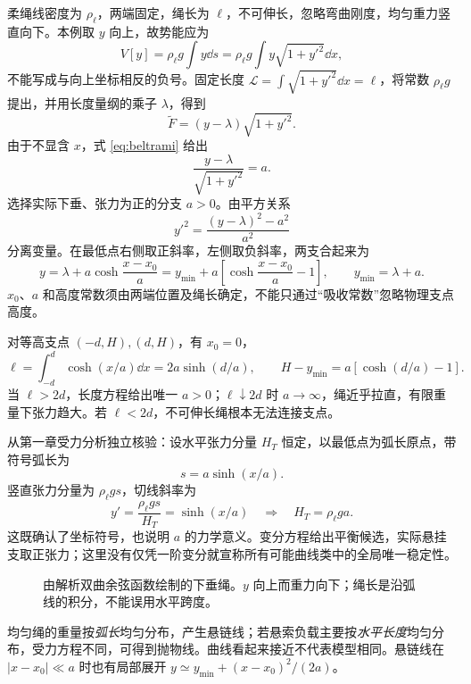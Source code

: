 \begin{example}[均匀柔绳的平衡形状]
柔绳线密度为 $\rho_\ell$，两端固定，绳长为 $\ell$，不可伸长，忽略弯曲刚度，均匀重力竖直向下。本例取 $y$ 向上，故势能应为
\[
V[y]=\rho_\ell g\int y\dd s
=\rho_\ell g\int y\sqrt{1+y'^2}\dd x,
\]
不能写成与向上坐标相反的负号。固定长度 $\mathcal L=\int\sqrt{1+y'^2}\dd x=\ell$，将常数 $\rho_\ell g$ 提出，并用长度量纲的乘子 $\lambda$，得到
\[
\widetilde F=(y-\lambda)\sqrt{1+y'^2}.
\]
由于不显含 $x$，式 \eqref{eq:beltrami} 给出
\[
\frac{y-\lambda}{\sqrt{1+y'^2}}=a.
\]
选择实际下垂、张力为正的分支 $a>0$。由平方关系
\[
y'^2=\frac{(y-\lambda)^2-a^2}{a^2}
\]
分离变量。在最低点右侧取正斜率，左侧取负斜率，两支合起来为
\begin{equation}\label{eq:var-catenary}
y=\lambda+a\cosh\frac{x-x_0}{a}
=y_{\min}+a\left[\cosh\frac{x-x_0}{a}-1\right],
\qquad y_{\min}=\lambda+a.
\end{equation}
$x_0$、$a$ 和高度常数须由两端位置及绳长确定，不能只通过“吸收常数”忽略物理支点高度。

对等高支点 $(-d,H),(d,H)$，有 $x_0=0$，
\[
\ell=\int_{-d}^d\cosh(x/a)\dd x=2a\sinh(d/a),\qquad
H-y_{\min}=a[\cosh(d/a)-1].
\]
当 $\ell>2d$，长度方程给出唯一 $a>0$；$\ell\downarrow2d$ 时 $a\to\infty$，绳近乎拉直，有限重量下张力趋大。若 $\ell<2d$，不可伸长绳根本无法连接支点。

从第一章受力分析独立核验：设水平张力分量 $H_T$ 恒定，以最低点为弧长原点，带符号弧长为
\[s=a\sinh(x/a).\]
竖直张力分量为 $\rho_\ell gs$，切线斜率为
\[
y'=\frac{\rho_\ell gs}{H_T}=\sinh(x/a)
\quad\Longrightarrow\quad H_T=\rho_\ell ga.
\]
这既确认了坐标符号，也说明 $a$ 的力学意义。变分方程给出平衡候选，实际悬挂支取正张力；这里没有仅凭一阶变分就宣称所有可能曲线类中的全局唯一稳定性。
\end{example}
\begin{figure}[htbp]
\centering
{}
\caption{由解析双曲余弦函数绘制的下垂绳。$y$ 向上而重力向下；绳长是沿弧线的积分，不能误用水平跨度。}
\label{fig:var-catenary}
\end{figure}
\begin{physicsbox}
均匀绳的重量按\emph{弧长}均匀分布，产生悬链线；若悬索负载主要按\emph{水平长度}均匀分布，受力方程不同，可得到抛物线。曲线看起来接近不代表模型相同。悬链线在 $|x-x_0|\ll a$ 时也有局部展开 $y\simeq y_{\min}+(x-x_0)^2/(2a)$。
\end{physicsbox}

